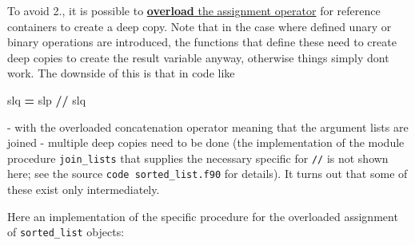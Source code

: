 \documentclass[
]{scrartcl}
\newenvironment{Shaded}{}{}
\newcommand{\KeywordTok}[1]{\textcolor[rgb]{0.00,0.44,0.13}{\textbf{#1}}}
\newcommand{\NormalTok}[1]{#1}
\begin{document}
To avoid 2., it is possible to
\href{https://en.wikipedia.org/wiki/Fortran_95_language_features\#Derived-data_types}{\textbf{overload}
the assignment operator} for reference containers to create a deep copy.
Note that in the case where defined unary or binary operations are
introduced, the functions that define these need to create deep copies
to create the result variable anyway, otherwise things simply
don\textquotesingle t work. The downside of this is that in code like

\begin{Shaded}
\begin{Highlighting}[]
\NormalTok{slq }\KeywordTok{=}\NormalTok{ slp }\KeywordTok{//}\NormalTok{ slq}
\end{Highlighting}
\end{Shaded}

- with the overloaded concatenation operator meaning that the argument
lists are joined - multiple deep copies need to be done (the
implementation of the module procedure \texttt{join\_lists} that
supplies the necessary specific for \texttt{//} is not shown here; see
the source \texttt{code\ sorted\_list.f90} for details). It turns out
that some of these exist only intermediately.

Here an implementation of the specific procedure for the overloaded
assignment of \texttt{sorted\_list} objects:
\end{document}
